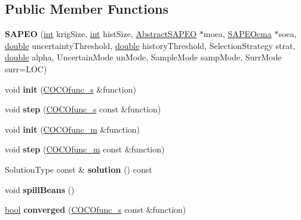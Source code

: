 \subsection*{Public Member Functions}
\begin{DoxyCompactItemize}
\item 
{\bfseries S\+A\+P\+EO} (\hyperlink{classint}{int} krig\+Size, \hyperlink{classint}{int} hist\+Size, \hyperlink{classAbstractSAPEO}{Abstract\+S\+A\+P\+EO} $\ast$moea, \hyperlink{classSAPEOcma}{S\+A\+P\+E\+Ocma} $\ast$soea, \hyperlink{classdouble}{double} uncertainty\+Threshold, \hyperlink{classdouble}{double} history\+Threshold, Selection\+Strategy strat, \hyperlink{classdouble}{double} alpha, Uncertain\+Mode un\+Mode, Sample\+Mode samp\+Mode, Surr\+Mode surr=L\+OC)\hypertarget{classSAPEO_a0a8eb9bd692d03b1492fcc9445ea99c4}{}\label{classSAPEO_a0a8eb9bd692d03b1492fcc9445ea99c4}

\item 
void {\bfseries init} (\hyperlink{classCOCOfunc__s}{C\+O\+C\+Ofunc\+\_\+s} \&function)\hypertarget{classSAPEO_a20ffa8d19c2943460226dedbbb0ec030}{}\label{classSAPEO_a20ffa8d19c2943460226dedbbb0ec030}

\item 
void {\bfseries step} (\hyperlink{classCOCOfunc__s}{C\+O\+C\+Ofunc\+\_\+s} const \&function)\hypertarget{classSAPEO_a86274a4d2d825ddd23d81db46e1a0f8c}{}\label{classSAPEO_a86274a4d2d825ddd23d81db46e1a0f8c}

\item 
void {\bfseries init} (\hyperlink{classCOCOfunc__m}{C\+O\+C\+Ofunc\+\_\+m} \&function)\hypertarget{classSAPEO_a63748b0a1749ae6e6ea8c0954843db4a}{}\label{classSAPEO_a63748b0a1749ae6e6ea8c0954843db4a}

\item 
void {\bfseries step} (\hyperlink{classCOCOfunc__m}{C\+O\+C\+Ofunc\+\_\+m} const \&function)\hypertarget{classSAPEO_a707e8b9313850741d0d2d5d02d37e36d}{}\label{classSAPEO_a707e8b9313850741d0d2d5d02d37e36d}

\item 
Solution\+Type const \& {\bfseries solution} () const \hypertarget{classSAPEO_aea1a011974956e10deb4a7c8ffbc3176}{}\label{classSAPEO_aea1a011974956e10deb4a7c8ffbc3176}

\item 
void {\bfseries spill\+Beans} ()\hypertarget{classSAPEO_a3d9635c19d436778aa988af12d2c8482}{}\label{classSAPEO_a3d9635c19d436778aa988af12d2c8482}

\item 
\hyperlink{classbool}{bool} {\bfseries converged} (\hyperlink{classCOCOfunc__s}{C\+O\+C\+Ofunc\+\_\+s} const \&function)\hypertarget{classSAPEO_a2a3dab554bf940f7517301cc44054c45}{}\label{classSAPEO_a2a3dab554bf940f7517301cc44054c45}


\end{DoxyCompactItemize}
